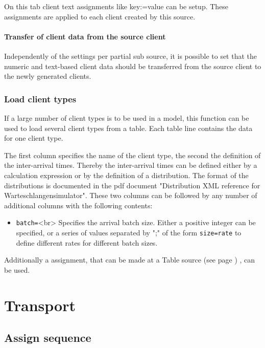 On this tab client text assignments like key:=value can be setup.
These assignments are applied to each client created by this source.

\subsubsection*{Transfer of client data from the source client}

Independently of the settings per partial sub source, it is possible to set that
the numeric and text-based client data should be transferred from the source client
to the newly generated clients.

\subsection*{Load client types}

If a large number of client types is to be used in a model, this function can be used
to load several client types from a table. Each table line contains the data for one client type.

The first column specifies the name of the client type, the second the definition of the inter-arrival times.
Thereby the inter-arrival times can be defined either by a calculation expression or by the definition of a
distribution. The format of the distributions is documented in the pdf document
"Distribution XML reference for Warteschlangensimulator". These two columns can be followed by any number
of additional columns with the following contents:

\begin{itemize}
  \item \texttt{batch=}<br>
  Specifies the arrival batch size. Either a positive integer can be specified, or a series of values separated
  by ";" of the form \texttt{size=rate} to define different rates for different batch sizes. 
\end{itemize}

Additionally a assignment, that can be made at a Table source (see page \pageref{ref:ModelElementSourceTable}) , can be used.





\chapter{Transport}

\section{Assign sequence}
\label{ref:ModelElementAssignSequence}

